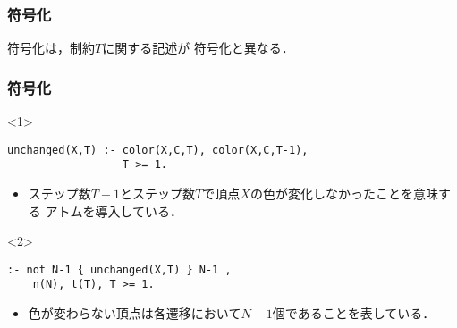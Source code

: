 \begin{frame}\frametitle{符号化}

  符号化は，制約$T$に関する記述が
  符号化と異なる．

  \begin{exampleblock}{}
    \centering
    
  \end{exampleblock}
  
\end{frame}

\begin{frame}[fragile]\frametitle{符号化}

  \begin{exampleblock}{}
    \centering
    
  \end{exampleblock}

  \begin{onlyenv}<1>
    \begin{exampleblock}{}
      \centering
      \begin{lstlisting}
unchanged(X,T) :- color(X,C,T), color(X,C,T-1), 
                  T >= 1.
      \end{lstlisting}
    \end{exampleblock}
    \begin{itemize}
      \item ステップ数$T-1$とステップ数$T$で頂点$X$の色が変化しなかったことを意味する
            アトムを導入している．
    \end{itemize}
  \end{onlyenv}

  \begin{onlyenv}<2>
    \begin{exampleblock}{}
      \centering
      \begin{lstlisting}
:- not N-1 { unchanged(X,T) } N-1 , 
    n(N), t(T), T >= 1.
      \end{lstlisting}
    \end{exampleblock}
    \begin{itemize}
      \item 色が変わらない頂点は各遷移において$N-1$個であることを表している．
    \end{itemize}
  \end{onlyenv}
  
\end{frame}

